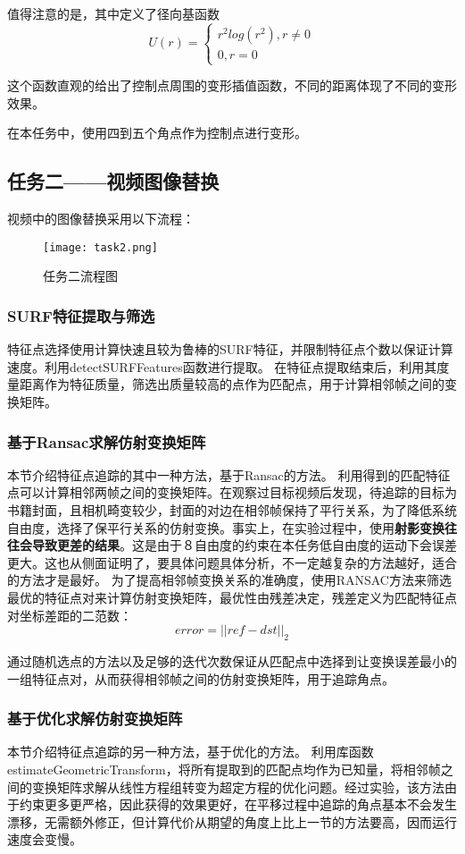 \documentclass[UTF8]{ctexart}
\begin{document}
值得注意的是，其中定义了径向基函数$$U(r)=\begin{cases}
    r^2log(r^2),r\neq0\\
    0,r=0
\end{cases}
$$

这个函数直观的给出了控制点周围的变形插值函数，不同的距离体现了不同的变形效果。

在本任务中，使用四到五个角点作为控制点进行变形。

\subsection{任务二——视频图像替换}  
视频中的图像替换采用以下流程：
\begin{figure}[H]
    \centering
    \texttt{[image: task2.png]}
    \caption{任务二流程图}
\end{figure}

\subsubsection{SURF特征提取与筛选}
特征点选择使用计算快速且较为鲁棒的SURF特征，并限制特征点个数以保证计算速度。利用detectSURFFeatures函数进行提取。
在特征点提取结束后，利用其度量距离作为特征质量，筛选出质量较高的点作为匹配点，用于计算相邻帧之间的变换矩阵。
\subsubsection{基于Ransac求解仿射变换矩阵}
本节介绍特征点追踪的其中一种方法，基于Ransac的方法。
利用得到的匹配特征点可以计算相邻两帧之间的变换矩阵。在观察过目标视频后发现，待追踪的目标为书籍封面，且相机畸变较少，封面的对边在相邻帧保持了平行关系，为了降低系统自由度，选择了保平行关系的仿射变换。事实上，在实验过程中，使用\textbf{射影变换往往会导致更差的结果}。这是由于８自由度的约束在本任务低自由度的运动下会误差更大。这也从侧面证明了，要具体问题具体分析，不一定越复杂的方法越好，适合的方法才是最好。
为了提高相邻帧变换关系的准确度，使用RANSAC方法来筛选最优的特征点对来计算仿射变换矩阵，最优性由残差决定，残差定义为匹配特征点对坐标差距的二范数：
\begin{equation}
    error = ||ref - dst||_2
\end{equation}

通过随机选点的方法以及足够的迭代次数保证从匹配点中选择到让变换误差最小的一组特征点对，从而获得相邻帧之间的仿射变换矩阵，用于追踪角点。
\subsubsection{基于优化求解仿射变换矩阵}\label{optimize}
本节介绍特征点追踪的另一种方法，基于优化的方法。
利用库函数estimateGeometricTransform，将所有提取到的匹配点均作为已知量，将相邻帧之间的变换矩阵求解从线性方程组转变为超定方程的优化问题。经过实验，该方法由于约束更多更严格，因此获得的效果更好，在平移过程中追踪的角点基本不会发生漂移，无需额外修正，但计算代价从期望的角度上比上一节的方法要高，因而运行速度会变慢。
\end{document}

